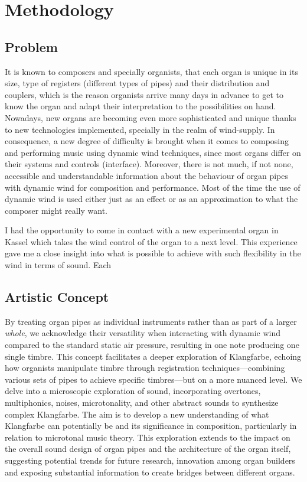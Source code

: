 \chapter{Methodology}
\section{Problem}

It is known to composers and specially organists, that each organ is unique in its size, type of registers (different types of pipes) and their distribution and couplers, which is the reason organists arrive many days in advance to get to know the organ and adapt their interpretation to the possibilities on hand. Nowadays, new organs are becoming even more sophisticated and unique thanks to new technologies implemented, specially in the realm of wind-supply. In consequence, a new degree of difficulty is brought when it comes to composing and performing music using dynamic wind techniques, since most organs differ on their systems and controls (interface). Moreover, there is not much, if not none, accessible and understandable information about the behaviour of organ pipes with dynamic wind for composition and performance. Most of the time the use of dynamic wind is used either just as an effect or as an approximation to what the composer might really want. 

I had the opportunity to come in contact with a new experimental organ in Kassel which takes the wind control of the organ to a next level. This experience gave me a close insight into what is possible to achieve with such flexibility in the wind in terms of sound. Each


\section{Artistic Concept}

By treating organ pipes as individual instruments rather than as part of a larger \textit{whole}, we acknowledge their versatility when interacting with dynamic wind compared to the standard static air pressure, resulting in one note producing one single timbre. This concept facilitates a deeper exploration of Klangfarbe, echoing how organists manipulate timbre through registration techniques—combining various sets of pipes to achieve specific timbres—but on a more nuanced level. We delve into a microscopic exploration of sound, incorporating overtones, multiphonics, noises, microtonality, and other abstract sounds to synthesize complex Klangfarbe. The aim is to develop a new understanding of what Klangfarbe can potentially be and its significance in composition, particularly in relation to microtonal music theory. This exploration extends to the impact on the overall sound design of organ pipes and the architecture of the organ itself, suggesting potential trends for future research, innovation among organ builders and exposing substantial information to create bridges between different organs. 

